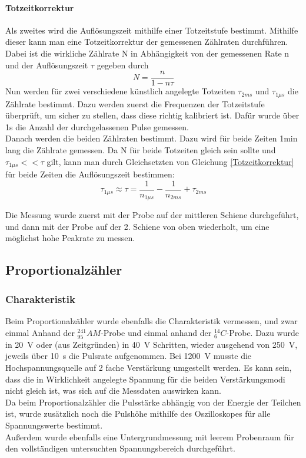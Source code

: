 \documentclass[12pt,a4paper]{article}
\begin{document}
\paragraph{Totzeitkorrektur}
Als zweites wird die Auflösungszeit mithilfe einer Totzeitstufe bestimmt. Mithilfe dieser kann man eine Totzeitkorrektur der gemessenen Zählraten durchführen. Dabei ist die wirkliche Zählrate N in Abhängigkeit von der gemessenen Rate n und der Auflösungszeit $\tau$ gegeben durch 
\begin{equation}
\label{Totzeitkorrektur}
N = \dfrac{n}{1-n\tau}
\end{equation}
Nun werden für zwei verschiedene künstlich angelegte Totzeiten $\tau_{2ms}$ und $\tau_{1\mu s}$ die Zählrate bestimmt. Dazu werden zuerst die Frequenzen der Totzeitstufe überprüft, um sicher zu stellen, dass diese richtig kalibriert ist. Dafür wurde über 1s die Anzahl der durchgelassenen Pulse gemessen.\\
Danach werden die beiden Zählraten bestimmt. Dazu wird für beide Zeiten 1min lang die Zählrate gemessen. Da N für beide Totzeiten gleich sein sollte und $\tau_{1\mu s} << \tau$ gilt, kann man durch Gleichsetzten von Gleichung \ref{Totzeitkorrektur} für beide Zeiten die Auflösungszeit bestimmen:
\begin{equation}
\tau_{1\mu s} \approx \tau = \dfrac{1}{n_{1\mu s}} - \dfrac{1}{n_{2ms}} + \tau_{2ms}
\label{Auslosungszeit}
\end{equation}

Die Messung wurde zuerst mit der Probe auf der mittleren Schiene durchgeführt, und dann mit der Probe auf der 2. Schiene von oben wiederholt, um eine möglichst hohe Peakrate zu messen.
\subsection{Proportionalzähler}

\subsubsection{Charakteristik}
Beim Proportionalzähler wurde ebenfalls die Charakteristik vermessen, und zwar einmal Anhand der $_{95}^{241}AM$-Probe und einmal anhand der $_6^{14}C$-Probe. Dazu wurde in \SI{20}{V} oder (aus Zeitgründen) in \SI{40}{V} Schritten, wieder ausgehend von \SI{250}{V}, jeweils über \SI{10}{s} die Pulsrate aufgenommen. Bei \SI{1200}{V} musste die Hochspannungsquelle auf 2 fache Verstärkung umgestellt werden. Es kann sein, dass die in Wirklichkeit angelegte Spannung für die beiden Verstärkungsmodi nicht gleich ist, was sich auf die Messdaten auswirken kann.\\
Da beim Proportionalzähler die Pulsstärke abhängig von der Energie der Teilchen ist, wurde zusätzlich noch die Pulshöhe mithilfe des Oszilloskopes für alle Spannungswerte bestimmt.\\
Außerdem wurde ebenfalls eine Untergrundmessung mit leerem Probenraum für den vollständigen untersuchten Spannungsbereich durchgeführt.
\end{document}
